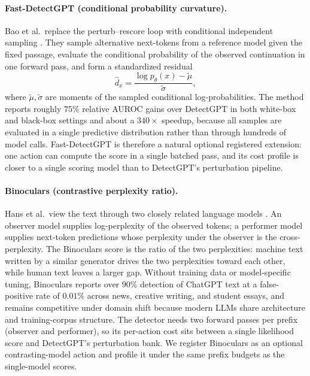 \documentclass[pdflatex,sn-mathphys-num]{sn-jnl}
\begin{document}
\paragraph*{Fast-DetectGPT (conditional probability curvature).}
Bao et al.\ replace the perturb--rescore loop with conditional independent sampling \citep{bao2024}. They sample alternative next-tokens from a reference model given the fixed passage, evaluate the conditional probability of the observed continuation in one forward pass, and form a standardized residual
\begin{equation}
 \hat d_x=\frac{\log p_\theta(x)-\tilde\mu}{\tilde\sigma},
 \label{eq:fastdetectgpt}
\end{equation}
where \(\tilde\mu,\tilde\sigma\) are moments of the sampled conditional log-probabilities. The method reports roughly \(75\%\) relative AUROC gains over DetectGPT in both white-box and black-box settings and about a \(340\times\) speedup, because all samples are evaluated in a single predictive distribution rather than through hundreds of model calls. Fast-DetectGPT is therefore a natural optional registered extension: one action can compute the score in a single batched pass, and its cost profile is closer to a single scoring model than to DetectGPT's perturbation pipeline.

\paragraph*{Binoculars (contrastive perplexity ratio).}
Hans et al.\ view the text through two closely related language models \citep{hans2024}. An observer model supplies log-perplexity of the observed tokens; a performer model supplies next-token predictions whose perplexity under the observer is the cross-perplexity. The Binoculars score is the ratio of the two perplexities: machine text written by a similar generator drives the two perplexities toward each other, while human text leaves a larger gap. Without training data or model-specific tuning, Binoculars reports over \(90\%\) detection of ChatGPT text at a false-positive rate of \(0.01\%\) across news, creative writing, and student essays, and remains competitive under domain shift because modern LLMs share architecture and training-corpus structure. The detector needs two forward passes per prefix (observer and performer), so its per-action cost sits between a single likelihood score and DetectGPT's perturbation bank. We register Binoculars as an optional contrasting-model action and profile it under the same prefix budgets as the single-model scores.
\end{document}
